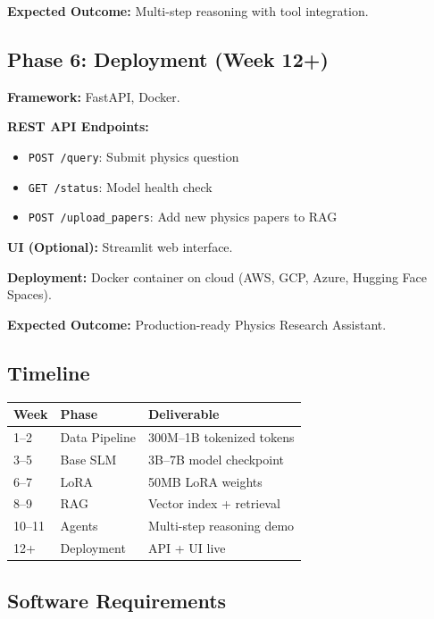 \documentclass[11pt]{article}
\begin{document}
\textbf{Expected Outcome:} Multi-step reasoning with tool integration.

\subsection{Phase 6: Deployment (Week 12+)}

\textbf{Framework:} FastAPI, Docker.

\textbf{REST API Endpoints:}
\begin{itemize}[leftmargin=1.2em]
  \item \texttt{POST /query}: Submit physics question
  \item \texttt{GET /status}: Model health check
  \item \texttt{POST /upload\_papers}: Add new physics papers to RAG
\end{itemize}

\textbf{UI (Optional):} Streamlit web interface.

\textbf{Deployment:} Docker container on cloud (AWS, GCP, Azure, Hugging Face Spaces).

\textbf{Expected Outcome:} Production-ready Physics Research Assistant.

\subsection{Timeline}

\begin{table}[H]
\centering
\small
\begin{tabular}{|l|l|l|}
\hline
\textbf{Week} & \textbf{Phase} & \textbf{Deliverable} \\
\hline
1--2 & Data Pipeline & 300M--1B tokenized tokens \\
\hline
3--5 & Base SLM & 3B--7B model checkpoint \\
\hline
6--7 & LoRA & 50MB LoRA weights \\
\hline
8--9 & RAG & Vector index + retrieval \\
\hline
10--11 & Agents & Multi-step reasoning demo \\
\hline
12+ & Deployment & API + UI live \\
\hline
\end{tabular}
\end{table}

\subsection{Software Requirements}
\end{document}
